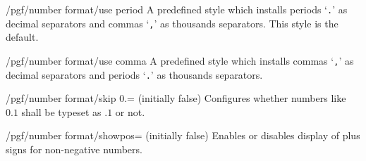 \begin{key}{/pgf/number format/use period}
A predefined style which installs periods `\texttt{.}' as decimal separators and commas `\texttt{,}' as thousands separators. This style is the default.

\begin{codeexample}[]
\end{codeexample}
\begin{codeexample}[]
\end{codeexample}
\end{key}

\begin{key}{/pgf/number format/use comma}
A predefined style which installs commas `\texttt{,}' as decimal separators and periods `\texttt{.}' as thousands separators.

\begin{codeexample}[]
\end{codeexample}
\begin{codeexample}[]
\end{codeexample}
\end{key}

\begin{key}{/pgf/number format/skip 0.= (initially false)}
	Configures whether numbers like $0.1$ shall be typeset as $.1$ or not.
\begin{codeexample}[]
\end{codeexample}
\begin{codeexample}[]
\end{codeexample}
\end{key}

\begin{key}{/pgf/number format/showpos= (initially false)}
	Enables or disables display of plus signs for non-negative numbers.
\begin{codeexample}[]
\end{codeexample}

\begin{codeexample}[]
\end{codeexample}

\begin{codeexample}[]
\end{codeexample}
\end{key}

